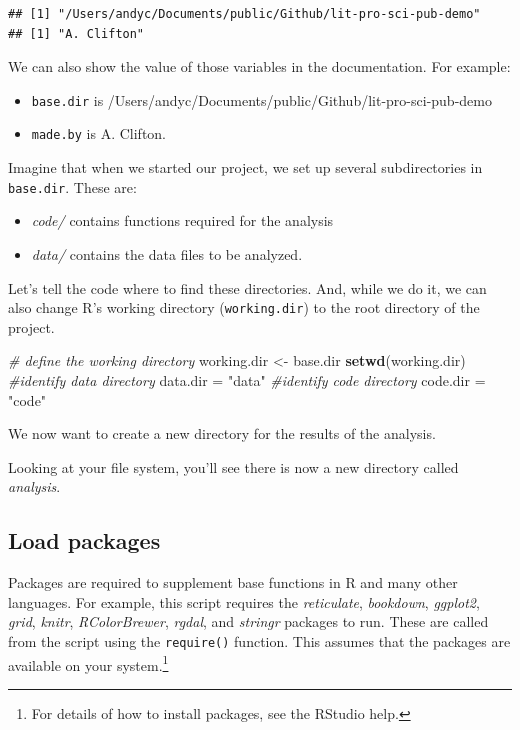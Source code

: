\documentclass[11pt,]{article}
\newenvironment{Shaded}{\begin{snugshade}}{\end{snugshade}}
\newcommand{\CommentTok}[1]{\textcolor[rgb]{0.56,0.35,0.01}{\textit{#1}}}
\newcommand{\KeywordTok}[1]{\textcolor[rgb]{0.13,0.29,0.53}{\textbf{#1}}}
\newcommand{\NormalTok}[1]{#1}
\newcommand{\StringTok}[1]{\textcolor[rgb]{0.31,0.60,0.02}{#1}}
\providecommand{\tightlist}{%
  \setlength{\itemsep}{0pt}\setlength{\parskip}{0pt}}
\let\rmarkdownfootnote\footnote%
\def\footnote{\protect\rmarkdownfootnote}
\begin{document}
\begin{verbatim}
## [1] "/Users/andyc/Documents/public/Github/lit-pro-sci-pub-demo"
## [1] "A. Clifton"
\end{verbatim}

We can also show the value of those variables in the documentation. For example:

\begin{itemize}
\tightlist
\item
  \texttt{base.dir} is /Users/andyc/Documents/public/Github/lit-pro-sci-pub-demo
\item
  \texttt{made.by} is A. Clifton.
\end{itemize}

Imagine that when we started our project, we set up several subdirectories in \texttt{base.dir}. These are:

\begin{itemize}
\tightlist
\item
  \emph{code/} contains functions required for the analysis
\item
  \emph{data/} contains the data files to be analyzed.
\end{itemize}

Let's tell the code where to find these directories. And, while we do it, we can also change R's working directory (\texttt{working.dir}) to the root directory of the project.

\begin{Shaded}
\begin{Highlighting}[]
\CommentTok{# define the working directory}
\NormalTok{working.dir <-}\StringTok{ }\NormalTok{base.dir}
\KeywordTok{setwd}\NormalTok{(working.dir)}
\CommentTok{#identify data directory}
\NormalTok{data.dir =}\StringTok{ "data"}
\CommentTok{#identify code directory}
\NormalTok{code.dir =}\StringTok{ "code"}
\end{Highlighting}
\end{Shaded}

We now want to create a new directory for the results of the analysis.

Looking at your file system, you'll see there is now a new directory called \emph{analysis}.

\hypertarget{load-packages}{%
\subsection{Load packages}\label{load-packages}}

Packages are required to supplement base functions in R and many other languages. For example, this script requires the \emph{reticulate}, \emph{bookdown}, \emph{ggplot2}, \emph{grid}, \emph{knitr}, \emph{RColorBrewer}, \emph{rgdal}, and \emph{stringr} packages to run. These are called from the script using the \texttt{require()} function. This assumes that the packages are available on your system.\footnote{For details of how to install packages, see the RStudio help.}
\end{document}
